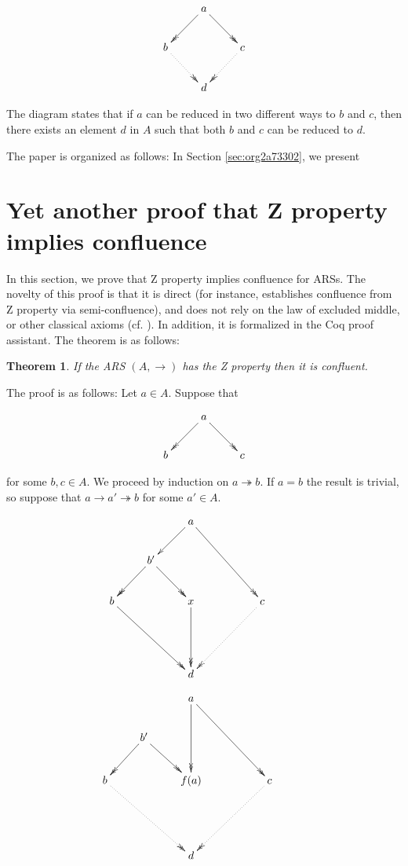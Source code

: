\documentclass[11pt]{article}
\newtheorem{theorem}{Theorem}[section]
\newcommand{\tto}{\twoheadrightarrow}
\begin{document}
\[
  \xymatrix{
    & a \ar@{->>}[dl] \ar@{->>}[dr] & \\
    b \ar@{.>>}[dr] &  & c \ar@{.>>}[dl] \\
    & d & 
  }
\]

The diagram states that if \(a\) can be reduced in two different ways
to \(b\) and \(c\), then there exists an element \(d\) in \(A\) such
that both \(b\) and \(c\) can be reduced to \(d\). 

The paper is organized as follows: In Section \ref{sec:org2a73302}, we present 

\section{Yet another proof that Z property implies confluence}
\label{sec:orgdea6d21}

In this section, we prove that Z property implies confluence for
ARSs. The novelty of this proof is that it is direct (for instance,
\cite{2016arXiv160903139N} establishes confluence from Z property via
semi-confluence), and does not rely on the law of excluded middle, or
other classical axioms
(cf. \cite{kesner09:_theor_explic_subst_with_safe_full_compos}). In
addition, it is formalized in the Coq proof assistant. The theorem is as follows:

\begin{theorem}
If the ARS \((A,\to)\) has the Z property then it is confluent.
\end{theorem}

The proof is as follows: Let \(a\in A\). Suppose that

\[
  \xymatrix{
    & a \ar@{->>}[dl] \ar@{->>}[dr] & \\
    b  &  & c 
  }
\]

\noindent for some \(b,c\in A\). We proceed by induction on \(a \tto
b\). If \(a=b\) the result is trivial, so suppose that \(a \to a' \tto
b\) for some \(a'\in A\). 

\[
  \xymatrix{
    & & a \ar@{->}[dl] \ar@{->>}[ddrr] & & \\
    & b' \ar@{->>}[dl] \ar@[blue]@{->>}[dr] & & & \\
    b \ar@[red]@{->>}[ddrr] & & x \ar@[red]@{->>}[dd] & &  c \ar@{.>>}[ddll] \\
    & & & & & \\
    & & d & &
   }
  \]

\[
  \xymatrix{
    & & a \ar@{->>}[dd] \ar@{->>}[ddrr] & & \\
    & b' \ar@{->>}[dl] \ar@{->>}[dr] & & & \\
    b \ar@{.>>}[ddrr] & & f(a) & &  c \ar@{.>>}[ddll] \\
    & & & & & \\
    & & d & &
   }
  \]
\end{document}
